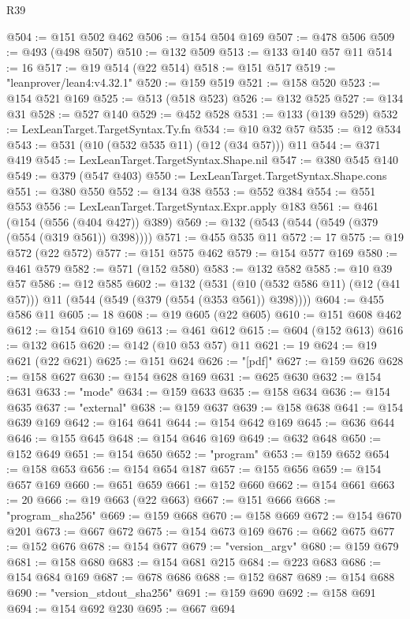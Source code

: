 \begin{lexlean}{R39}
\begin{coremodule}
@504 := @151 @502 @462
@506 := @154 @504 @169
@507 := @478 @506
@509 := @493 (@498 @507)
@510 := @132 @509
@513 := @133 @140 @57 @11
@514 := 16
@517 := @19 @514 (@22 @514)
@518 := @151 @517
@519 := "leanprover/lean4:v4.32.1"
@520 := @159 @519
@521 := @158 @520
@523 := @154 @521 @169
@525 := @513 (@518 @523)
@526 := @132 @525
@527 := @134 @31
@528 := @527 @140
@529 := @452 @528
@531 := @133 (@139 @529)
@532 := LexLeanTarget.TargetSyntax.Ty.fn
@534 := @10 @32 @57
@535 := @12 @534
@543 := @531 (@10 (@532 @535 @11) (@12 (@34 @57))) @11
@544 := @371 @419
@545 := LexLeanTarget.TargetSyntax.Shape.nil
@547 := @380 @545 @140
@549 := @379 (@547 @403)
@550 := LexLeanTarget.TargetSyntax.Shape.cons
@551 := @380 @550
@552 := @134 @38
@553 := @552 @384
@554 := @551 @553
@556 := LexLeanTarget.TargetSyntax.Expr.apply @183
@561 := @461 (@154 (@556 (@404 @427)) @389)
@569 := @132 (@543 (@544 (@549 (@379 (@554 (@319 @561)) @398))))
@571 := @455 @535 @11
@572 := 17
@575 := @19 @572 (@22 @572)
@577 := @151 @575 @462
@579 := @154 @577 @169
@580 := @461 @579
@582 := @571 (@152 @580)
@583 := @132 @582
@585 := @10 @39 @57
@586 := @12 @585
@602 := @132
    (@531 (@10 (@532 @586 @11) (@12 (@41 @57))) @11 (@544 (@549 (@379 (@554 (@353 @561)) @398))))
@604 := @455 @586 @11
@605 := 18
@608 := @19 @605 (@22 @605)
@610 := @151 @608 @462
@612 := @154 @610 @169
@613 := @461 @612
@615 := @604 (@152 @613)
@616 := @132 @615
@620 := @142 (@10 @53 @57) @11
@621 := 19
@624 := @19 @621 (@22 @621)
@625 := @151 @624
@626 := "[pdf]"
@627 := @159 @626
@628 := @158 @627
@630 := @154 @628 @169
@631 := @625 @630
@632 := @154 @631
@633 := "mode"
@634 := @159 @633
@635 := @158 @634
@636 := @154 @635
@637 := "external"
@638 := @159 @637
@639 := @158 @638
@641 := @154 @639 @169
@642 := @164 @641
@644 := @154 @642 @169
@645 := @636 @644
@646 := @155 @645
@648 := @154 @646 @169
@649 := @632 @648
@650 := @152 @649
@651 := @154 @650
@652 := "program"
@653 := @159 @652
@654 := @158 @653
@656 := @154 @654 @187
@657 := @155 @656
@659 := @154 @657 @169
@660 := @651 @659
@661 := @152 @660
@662 := @154 @661
@663 := 20
@666 := @19 @663 (@22 @663)
@667 := @151 @666
@668 := "program_sha256"
@669 := @159 @668
@670 := @158 @669
@672 := @154 @670 @201
@673 := @667 @672
@675 := @154 @673 @169
@676 := @662 @675
@677 := @152 @676
@678 := @154 @677
@679 := "version_argv"
@680 := @159 @679
@681 := @158 @680
@683 := @154 @681 @215
@684 := @223 @683
@686 := @154 @684 @169
@687 := @678 @686
@688 := @152 @687
@689 := @154 @688
@690 := "version_stdout_sha256"
@691 := @159 @690
@692 := @158 @691
@694 := @154 @692 @230
@695 := @667 @694

\end{coremodule}
\end{lexlean}
